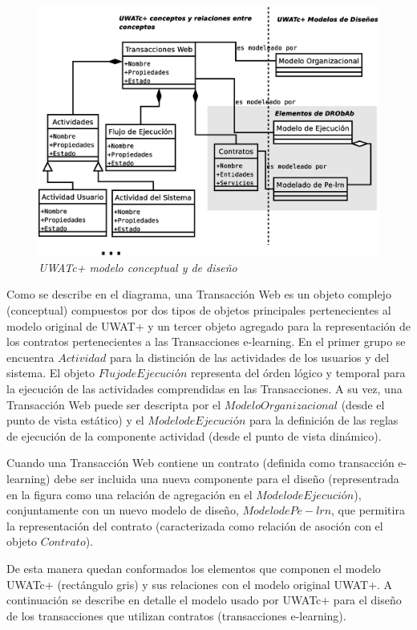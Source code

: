 \documentclass[12 pt,a4paper]{llncs}
\begin{document}
	\begin{figure}[!h]
        \begin{center}
	\includegraphics[width=5 in,totalheight=3 in]{drobab.eps}
	\caption{\small \sl UWATc+ modelo conceptual y de diseño} \label{drobab}
         \end{center}
         \end{figure}


Como se describe en el diagrama, una Transacción Web es un objeto complejo (conceptual) compuestos por dos tipos de objetos principales pertenecientes al modelo original de UWAT+ y un tercer objeto  agregado para la representación de los contratos pertenecientes a las Transacciones e-learning. En el primer grupo se encuentra $Actividad$ para la distinción de las actividades de los usuarios y del sistema. El objeto $Flujo de Ejecución$ representa del órden lógico y temporal para la ejecución de las actividades comprendidas en las Transacciones. A su vez, una Transacción Web puede ser descripta por el $Modelo Organizacional$ (desde el punto de vista estático) y el $Modelo de Ejecución$ para la definición de las reglas de ejecución de la componente actividad (desde el punto de vista dinámico). 

Cuando una Transacción Web contiene un contrato (definida como transacción e-learning) debe ser incluida una nueva componente para el diseño (representrada en la figura como una relación de agregación en el $Modelo de Ejecución$), conjuntamente con un nuevo modelo de diseño, $Modelo de Pe-lrn$, que permitira la representación del contrato (caracterizada como relación de asoción con el objeto $Contrato$).

De esta manera quedan conformados los elementos que componen el modelo UWATc+ (rectángulo gris) y sus relaciones con el modelo original UWAT+. A continuación se describe en detalle el modelo usado por UWATc+ para el diseño de los transacciones que utilizan contratos (transacciones e-learning). 
\end{document}
